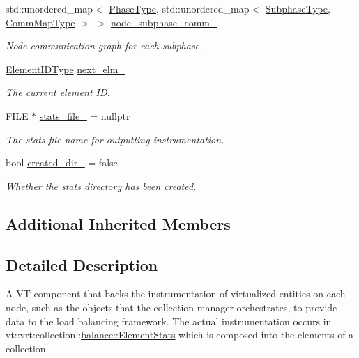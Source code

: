 \begin{DoxyCompactItemize}
std\+::unordered\+\_\+map$<$ \hyperlink{namespacevt_a46ce6733d5cdbd735d561b7b4029f6d7}{Phase\+Type}, std\+::unordered\+\_\+map$<$ \hyperlink{namespacevt_ae78cbfdf1e57470e33eedb074f2beeba}{Subphase\+Type}, \hyperlink{namespacevt_1_1vrt_1_1collection_1_1balance_a10860c956804d644db54a16012352728}{Comm\+Map\+Type} $>$ $>$ \hyperlink{structvt_1_1vrt_1_1collection_1_1balance_1_1_node_stats_a70b5f9052ce87030b3476800e428bcb2}{node\+\_\+subphase\+\_\+comm\+\_\+}
\begin{DoxyCompactList}\small\item\em Node communication graph for each subphase. \end{DoxyCompactList}\item 
\hyperlink{namespacevt_1_1vrt_1_1collection_1_1balance_a14c8d2c972f2913aa3f1636e5be0a120}{Element\+I\+D\+Type} \hyperlink{structvt_1_1vrt_1_1collection_1_1balance_1_1_node_stats_a7b1b992f34d07739e854c95ef921f0ab}{next\+\_\+elm\+\_\+}
\begin{DoxyCompactList}\small\item\em The current element ID. \end{DoxyCompactList}\item 
F\+I\+LE $\ast$ \hyperlink{structvt_1_1vrt_1_1collection_1_1balance_1_1_node_stats_a8f2c59c675643634d8e4d2d5ba89ecbd}{stats\+\_\+file\+\_\+} = nullptr
\begin{DoxyCompactList}\small\item\em The stats file name for outputting instrumentation. \end{DoxyCompactList}\item 
bool \hyperlink{structvt_1_1vrt_1_1collection_1_1balance_1_1_node_stats_a41cafe7ec8557587a5e922c2289de342}{created\+\_\+dir\+\_\+} = false
\begin{DoxyCompactList}\small\item\em Whether the stats directory has been created. \end{DoxyCompactList}\end{DoxyCompactItemize}
\subsection*{Additional Inherited Members}


\subsection{Detailed Description}
A VT component that backs the instrumentation of virtualized entities on each node, such as the objects that the collection manager orchestrates, to provide data to the load balancing framework. The actual instrumentation occurs in {\ttfamily vt\+::vrt\+:collection\+:}\+:\hyperlink{structvt_1_1vrt_1_1collection_1_1balance_1_1_element_stats}{balance\+::\+Element\+Stats} which is composed into the elements of a collection. 

